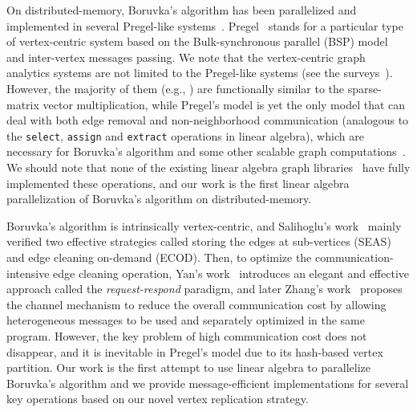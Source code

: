 \documentclass{sokendai_thesis} %
\newcommand{\boruvka}[0]{Boruvka}
\begin{document}
On distributed-memory, \boruvka{}'s algorithm has been parallelized and implemented in several Pregel-like systems~\cite{salihoglu2013gps,yan2014pregel,zhang2019composing}.
Pregel~\cite{pregel} stands for a particular type of vertex-centric system based on the Bulk-synchronous parallel (BSP) model~\cite{bsp} and inter-vertex messages passing.
We note that the vertex-centric graph analytics systems are not limited to the Pregel-like systems (see the surveys~\cite{mccune2015thinking,yan2017big}).
However, the majority of them (e.g., \cite{low2012distributed,powergraph,powerlyra,graphmat,gemini,dathathri2018gluon}) are functionally similar to the sparse-matrix vector multiplication, while Pregel's model is yet the only model that can deal with both edge removal and non-neighborhood communication (analogous to the \texttt{select}, \texttt{assign} and \texttt{extract} operations in linear algebra), which are necessary for \boruvka{}'s algorithm and some other scalable graph computations~\cite{fastsv,lacc,salihoglu2014help}.
We should note that none of the existing linear algebra graph libraries~\cite{combblas,graphpad,graphmat} have fully implemented these operations, and our work is the first linear algebra parallelization of \boruvka{}'s algorithm on distributed-memory.

\boruvka{}'s algorithm is intrinsically vertex-centric, and Salihoglu's work~\cite{salihoglu2014optimizing} mainly verified two effective strategies called storing the edges at sub-vertices (SEAS) and edge cleaning on-demand (ECOD).
Then, to optimize the communication-intensive edge cleaning operation, Yan's work~\cite{yan2015effective} introduces an elegant and effective approach called the \emph{request-respond} paradigm, and later Zhang's work~\cite{zhang2019composing} proposes the channel mechanism to reduce the overall communication cost by allowing heterogeneous messages to be used and separately optimized in the same program.
However, the key problem of high communication cost does not disappear, and it is inevitable in Pregel's model due to its hash-based vertex partition.
Our work is the first attempt to use linear algebra to parallelize \boruvka{}'s algorithm and we provide message-efficient implementations for several key operations based on our novel vertex replication strategy.
\end{document}
